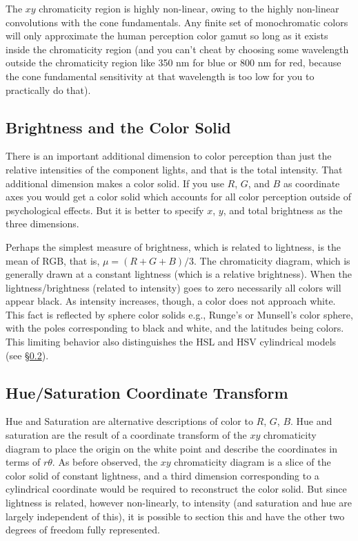 \documentclass{article}
\begin{document}
The $xy$ chromaticity region is highly non-linear, owing to the highly
non-linear convolutions with the cone fundamentals. Any finite set of
monochromatic colors will only approximate the human perception color gamut so
long as it exists inside the chromaticity region (and you can't cheat by
choosing some wavelength outside the chromaticity region like 350 nm for blue
or 800 nm for red, because the cone fundamental sensitivity at that wavelength
is too low for you to practically do that).

\subsection{Brightness and the Color Solid}

There is an important additional dimension to color perception than just the
relative intensities of the component lights, and that is the total intensity.
That additional dimension makes a color solid. If you use $R$, $G$, and $B$ as
coordinate axes you would get a color solid which accounts for all color perception
outside of psychological effects. But it is better to specify $x$, $y$, and
total brightness as the three dimensions.

Perhaps the simplest measure of brightness, which is related to lightness, is
the mean of RGB, that is, $\mu = (R + G + B)/3$. The chromaticity diagram,
which is generally drawn at a constant lightness (which is a relative
brightness).  When the lightness/brightness (related to intensity) goes to zero
necessarily all colors will appear black. As intensity increases, though, a
color does not approach white. This fact is reflected by sphere color solids 
e.g., Runge's or Munsell's color sphere, with the poles corresponding to black and
white, and the latitudes being colors. This limiting behavior also
distinguishes the HSL and HSV cylindrical models (see \S\ref{sec:sat-hue-trans}).

\subsection{Hue/Saturation Coordinate Transform}\label{sec:sat-hue-trans}

Hue and Saturation are alternative descriptions of color to $R$, $G$, $B$.
Hue and saturation are the result of a coordinate transform of the $xy$
chromaticity diagram to place the origin on the white point and describe the
coordinates in terms of $r\theta$. As before observed, the $xy$ chromaticity
diagram is a slice of the color solid of constant lightness, and a third
dimension corresponding to a cylindrical coordinate would be required to
reconstruct the color solid. But since lightness is related, however
non-linearly, to intensity (and saturation and hue are largely independent of
this), it is possible to section this and have the other two degrees of freedom
fully represented.
\end{document}
